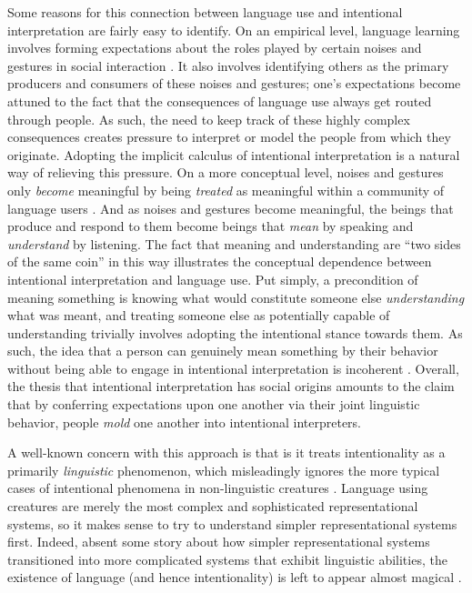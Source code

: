 Some reasons for this connection between language use and intentional interpretation are fairly easy to identify. On an empirical level, language learning involves forming expectations about the roles played by certain noises and gestures in social interaction \citep{Tomasello:2005}. It also involves identifying others as the primary producers and consumers of these noises and gestures; one's expectations become attuned to the fact that the consequences of language use always get routed through people. As such, the need to keep track of these highly complex consequences creates pressure to interpret or model the people from which they originate. Adopting the implicit calculus of intentional interpretation is a natural way of relieving this pressure. On a more conceptual level, noises and gestures only \textit{become} meaningful by being \textit{treated} as meaningful within a community of language users \citep{Brandom:1994}. And as noises and gestures become meaningful, the beings that produce and respond to them become beings that \textit{mean} by speaking and \textit{understand} by listening. The fact that meaning and understanding are ``two sides of the same coin'' in this way illustrates the conceptual dependence between intentional interpretation and language use. Put simply, a precondition of meaning something is knowing what would constitute someone else \textit{understanding} what was meant, and treating someone else as potentially capable of understanding trivially involves adopting the intentional stance towards them. As such, the idea that a person can genuinely mean something by their behavior without being able to engage in intentional interpretation is incoherent \citep{Brandom:1994}. Overall, the thesis that intentional interpretation has social origins amounts to the claim that by conferring expectations upon one another via their joint linguistic behavior, people \textit{mold} one another into intentional interpreters. 

A well-known concern with this approach is that is it treats intentionality as a primarily \textit{linguistic} phenomenon, which misleadingly ignores the more typical cases of intentional phenomena in non-linguistic creatures \citep{Eliasmith:2000,Dennett:1987,Dennett:2010,Millikan:1989,Millikan:2005,Dretske:1986}. Language using creatures are merely the most complex and sophisticated representational systems, so it makes sense to try to understand simpler representational systems first. Indeed, absent some story about how simpler representational systems transitioned into more complicated systems that exhibit linguistic abilities, the existence of language (and hence intentionality) is left to appear almost magical \citep{Dennett:2010}. 

